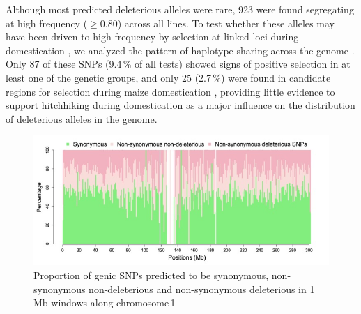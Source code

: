 \documentclass[12pt]{article}
\begin{document}
Although most predicted deleterious alleles were rare, 923 were found segregating at high frequency ($\geq 0.80$) across all lines.  To test whether these alleles may have been driven to high frequency by selection at linked loci during domestication \citep{Lu2006}, we analyzed the pattern of haplotype sharing across the genome \citep[PHS statistics;][]{Toomajian2006}. Only 87 of these SNPs (9.4\,\% of all tests) showed signs of positive selection in at least one of the genetic groups, and only 25 (2.7\,\%) were found in candidate regions for selection during maize domestication \citep{Hufford2012}, providing little evidence to support hitchhiking during domestication as a major influence on the distribution of deleterious alleles in the genome.

\begin{figure}[!t]
  \begin{center}
   \includegraphics[width=140mm]{PerDelGenome_ch1.jpg}
    \caption{Proportion of genic SNPs predicted to be synonymous, non-synonymous non-deleterious and non-synonymous deleterious in 1\,Mb windows along chromosome\,1} 
   \label{non_syn_chr1}
  \end{center}
\end{figure}
\end{document}
